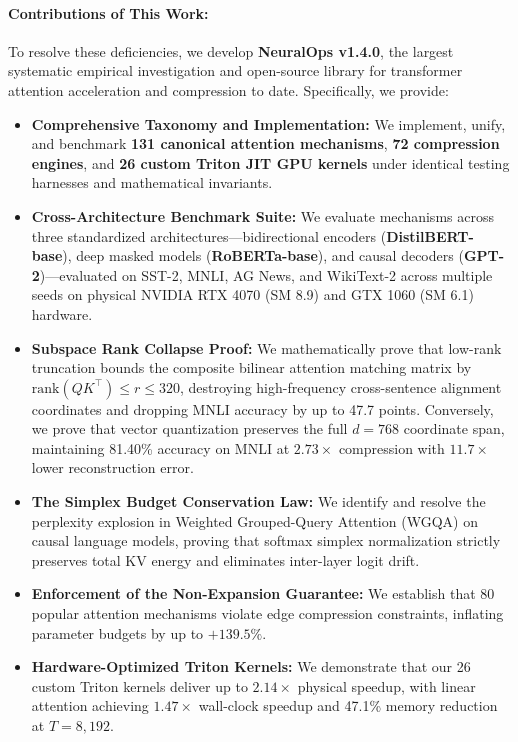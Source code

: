 \documentclass{article}
\begin{document}
\paragraph{Contributions of This Work:}
To resolve these deficiencies, we develop \textbf{NeuralOps v1.4.0}, the largest systematic empirical investigation and open-source library for transformer attention acceleration and compression to date. Specifically, we provide:
\begin{itemize}
    \item \textbf{Comprehensive Taxonomy and Implementation:} We implement, unify, and benchmark \textbf{131 canonical attention mechanisms}, \textbf{72 compression engines}, and \textbf{26 custom Triton JIT GPU kernels} under identical testing harnesses and mathematical invariants.
    \item \textbf{Cross-Architecture Benchmark Suite:} We evaluate mechanisms across three standardized architectures---bidirectional encoders (\textbf{DistilBERT-base}), deep masked models (\textbf{RoBERTa-base}), and causal decoders (\textbf{GPT-2})---evaluated on SST-2, MNLI, AG News, and WikiText-2 across multiple seeds on physical NVIDIA RTX 4070 (SM 8.9) and GTX 1060 (SM 6.1) hardware.
    \item \textbf{Subspace Rank Collapse Proof:} We mathematically prove that low-rank truncation bounds the composite bilinear attention matching matrix by $\text{rank}(QK^\top) \le r \le 320$, destroying high-frequency cross-sentence alignment coordinates and dropping MNLI accuracy by up to 47.7 points. Conversely, we prove that vector quantization preserves the full $d=768$ coordinate span, maintaining 81.40\% accuracy on MNLI at $2.73\times$ compression with $11.7\times$ lower reconstruction error.
    \item \textbf{The Simplex Budget Conservation Law:} We identify and resolve the perplexity explosion in Weighted Grouped-Query Attention (WGQA) on causal language models, proving that softmax simplex normalization strictly preserves total KV energy and eliminates inter-layer logit drift.
    \item \textbf{Enforcement of the Non-Expansion Guarantee:} We establish that 80 popular attention mechanisms violate edge compression constraints, inflating parameter budgets by up to $+139.5\%$.
    \item \textbf{Hardware-Optimized Triton Kernels:} We demonstrate that our 26 custom Triton kernels deliver up to $2.14\times$ physical speedup, with linear attention achieving $1.47\times$ wall-clock speedup and 47.1\% memory reduction at $T=8,192$.
\end{itemize}
\end{document}
